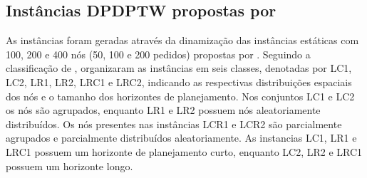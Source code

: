\documentclass{anpet}
\begin{document}
\subsection{Instâncias DPDPTW propostas por \textcite{pureza_waiting_2008}}

As instâncias foram geradas através da dinamização das instâncias estáticas com 100, 200 e 400 nós (50, 100 e 200 pedidos) propostas por \textcite{li_metaheuristic_2003}. Seguindo a classificação de \textcite{solomon_algorithms_1987},  \textcite{li_metaheuristic_2003} organizaram as instâncias em seis classes, denotadas por LC1, LC2, LR1, LR2, LRC1 e LRC2, indicando as respectivas distribuições espaciais dos nós e o tamanho dos horizontes de planejamento. Nos conjuntos LC1 e LC2 os nós são agrupados, enquanto LR1 e LR2 possuem nós aleatoriamente distribuídos. Os nós presentes nas instâncias LCR1 e LCR2 são parcialmente agrupados e parcialmente distribuídos aleatoriamente. As instancias LC1, LR1 e LRC1 possuem um horizonte de planejamento curto, enquanto LC2, LR2 e LRC1 possuem um horizonte longo.
\end{document}
